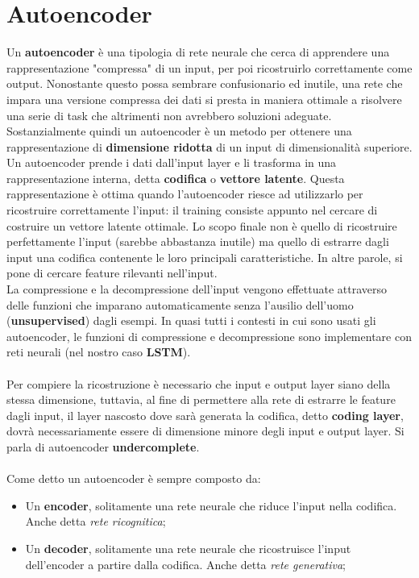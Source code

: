 \section{Autoencoder}
Un \textbf{autoencoder} è una tipologia di rete neurale che cerca di apprendere una rappresentazione "compressa" di un input, per poi ricostruirlo correttamente come output. Nonostante questo possa sembrare confusionario ed inutile, una rete che impara una versione compressa dei dati si presta in maniera ottimale a risolvere una serie di task che altrimenti non avrebbero soluzioni adeguate. Sostanzialmente quindi un autoencoder è un metodo per ottenere una rappresentazione di \textbf{dimensione ridotta} di un input di dimensionalità superiore. \\
Un autoencoder prende i dati dall'input layer e li trasforma in una rappresentazione interna, detta \textbf{codifica} o \textbf{vettore latente}. Questa rappresentazione è ottima quando l'autoencoder riesce ad utilizzarlo per ricostruire correttamente l'input: il training consiste appunto nel cercare di costruire un vettore latente ottimale. Lo scopo finale non è quello di ricostruire perfettamente l'input (sarebbe abbastanza inutile) ma quello di estrarre dagli input una codifica contenente le loro principali caratteristiche. In altre parole, si pone di cercare feature rilevanti nell'input.\\
La compressione e la decompressione dell'input vengono effettuate attraverso delle funzioni che imparano automaticamente senza l'ausilio dell'uomo (\textbf{unsupervised}) dagli esempi. In quasi tutti i contesti in cui sono usati gli autoencoder, le funzioni di compressione e decompressione sono implementare con reti neurali (nel nostro caso \textbf{LSTM}).\\
\\
Per compiere la ricostruzione è necessario che input e output layer siano della stessa dimensione, tuttavia, al fine di permettere alla rete di estrarre le feature dagli input, il layer nascosto dove sarà generata la codifica, detto \textbf{coding layer}, dovrà necessariamente essere di dimensione minore degli input e output layer. Si parla di autoencoder \textbf{undercomplete}.\\
\\
Come detto un autoencoder è sempre composto da:
\begin{itemize}
	\item Un \textbf{encoder}, solitamente una rete neurale che riduce l'input nella codifica. Anche detta \textit{rete ricognitica};
	\item Un \textbf{decoder}, solitamente una rete neurale che ricostruisce l'input dell'encoder a partire dalla codifica. Anche detta \textit{rete generativa};
\end{itemize}
